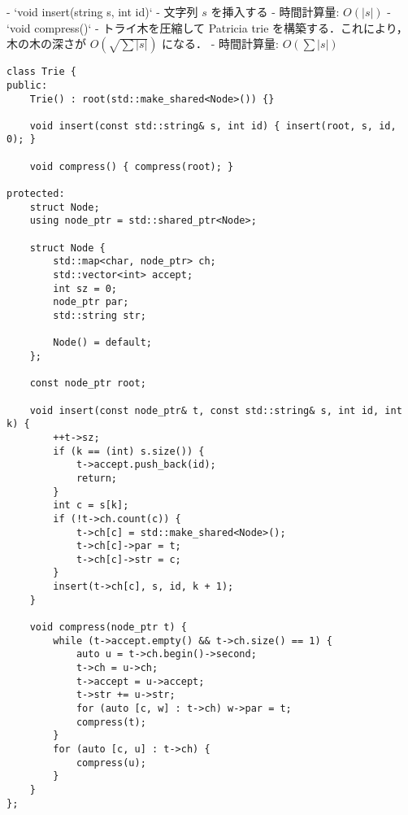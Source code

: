 \begin{small}
\begin{markdown}
- `void insert(string s, int id)`
    - 文字列 $s$ を挿入する
    - 時間計算量: $O(\vert s\vert)$
- `void compress()`
    - トライ木を圧縮して Patricia trie を構築する．これにより，木の木の深さが $O(\sqrt{\sum \vert s \vert})$ になる．
    - 時間計算量: $O(\sum \vert s\vert)$
\end{markdown}
\end{small}

\begin{lstlisting}
class Trie {
public:
    Trie() : root(std::make_shared<Node>()) {}

    void insert(const std::string& s, int id) { insert(root, s, id, 0); }

    void compress() { compress(root); }

protected:
    struct Node;
    using node_ptr = std::shared_ptr<Node>;

    struct Node {
        std::map<char, node_ptr> ch;
        std::vector<int> accept;
        int sz = 0;
        node_ptr par;
        std::string str;

        Node() = default;
    };

    const node_ptr root;

    void insert(const node_ptr& t, const std::string& s, int id, int k) {
        ++t->sz;
        if (k == (int) s.size()) {
            t->accept.push_back(id);
            return;
        }
        int c = s[k];
        if (!t->ch.count(c)) {
            t->ch[c] = std::make_shared<Node>();
            t->ch[c]->par = t;
            t->ch[c]->str = c;
        }
        insert(t->ch[c], s, id, k + 1);
    }

    void compress(node_ptr t) {
        while (t->accept.empty() && t->ch.size() == 1) {
            auto u = t->ch.begin()->second;
            t->ch = u->ch;
            t->accept = u->accept;
            t->str += u->str;
            for (auto [c, w] : t->ch) w->par = t;
            compress(t);
        }
        for (auto [c, u] : t->ch) {
            compress(u);
        }
    }
};
\end{lstlisting}